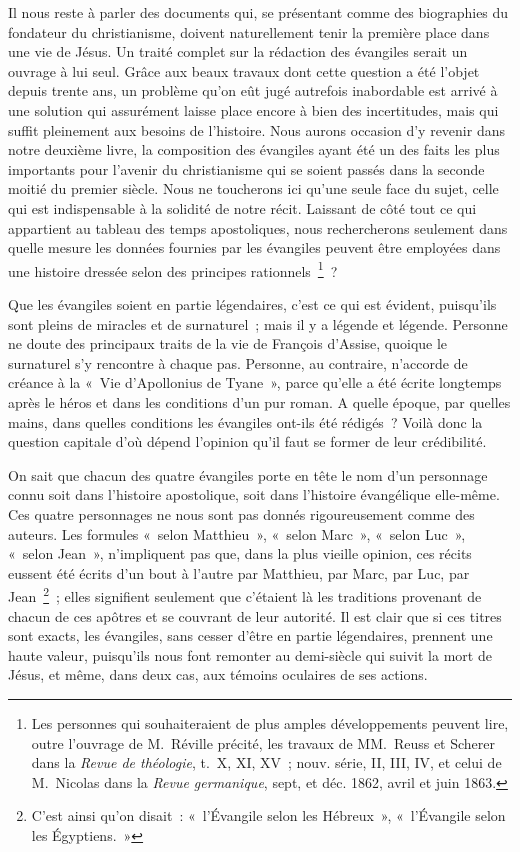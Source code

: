 \documentclass[french,twoside]{book} %
\begin{document}
Il nous reste à parler des documents qui, se présentant comme des biographies du fondateur du christianisme, doivent naturellement tenir la première place dans une vie de Jésus. Un traité complet sur la rédaction des évangiles serait un ouvrage à lui seul. Grâce aux beaux travaux dont cette question a été l’objet depuis trente ans, un problème qu’on eût jugé autrefois inabordable est arrivé à une solution qui assurément laisse place encore à bien des incertitudes, mais qui suffit pleinement aux besoins de l’histoire. Nous aurons occasion d’y revenir dans notre deuxième livre, la composition des évangiles ayant été un des faits les plus importants pour l’avenir du christianisme qui se soient passés dans la seconde moitié du premier siècle. Nous ne toucherons ici qu’une seule face du sujet, celle qui est indispensable à la solidité de notre récit. Laissant de côté tout ce qui appartient au tableau des temps apostoliques, nous rechercherons seulement dans quelle mesure les données fournies par les évangiles peuvent être employées dans une histoire dressée selon des principes rationnels \footnote{ Les personnes qui souhaiteraient de plus amples développements peuvent lire, outre l’ouvrage de M. Réville précité, les travaux de MM. Reuss et Scherer dans la {\itshape Revue de théologie}, t. X, XI, XV ; nouv. série, II, III, IV, et celui de M. Nicolas dans la {\itshape Revue germanique}, sept, et déc. 1862, avril et juin 1863.} ?\par
Que les évangiles soient en partie légendaires, c’est ce qui est évident, puisqu’ils sont pleins de miracles et de surnaturel ; mais il y a légende et légende. Personne ne doute des principaux traits de la vie de François d’Assise, quoique le surnaturel s’y rencontre à chaque pas. Personne, au contraire, n’accorde de créance à la « Vie d’Apollonius de Tyane », parce qu’elle a été écrite longtemps après le héros et dans les conditions d’un pur roman. A quelle époque, par quelles mains, dans quelles conditions les évangiles ont-ils été rédigés ? Voilà donc la question capitale d’où dépend l’opinion qu’il faut se former de leur crédibilité.\par
On sait que chacun des quatre évangiles porte en tête le nom d’un personnage connu soit dans l’histoire apostolique, soit dans l’histoire évangélique elle-même. Ces quatre personnages ne nous sont pas donnés rigoureusement comme des auteurs. Les formules « selon Matthieu », « selon Marc », « selon Luc », « selon Jean », n’impliquent pas que, dans la plus vieille opinion, ces récits eussent été écrits d’un bout à l’autre par Matthieu, par Marc, par Luc, par Jean \footnote{C’est ainsi qu’on disait : « l’Évangile selon les Hébreux », « l’Évangile selon les Égyptiens. »} ; elles signifient seulement que c’étaient là les traditions provenant de chacun de ces apôtres et se couvrant de leur autorité. Il est clair que si ces titres sont exacts, les évangiles, sans cesser d’être en partie légendaires, prennent une haute valeur, puisqu’ils nous font remonter au demi-siècle qui suivit la mort de Jésus, et même, dans deux cas, aux témoins oculaires de ses actions.\par
\end{document}
